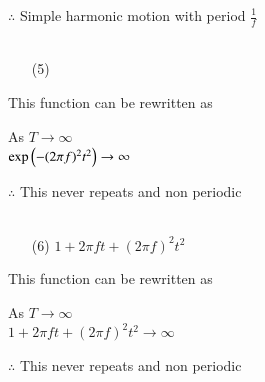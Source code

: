 \documentclass[journal,12pt,twocolumn]{IEEEtran}
\theoremstyle{remark}
\begin{document}
 $\therefore$  Simple harmonic motion with period $\frac{1}{f}$\\
 \\
 \begin{enumerate}
 \item[(5)]  \\
\end{enumerate}
This function can be rewritten as\\ 
       \begin{center}
     As $T\to\infty$\\
    $\text{exp}\left(-(2\pi f)^2 t^2\right)\to \infty$\\ 
       \end{center}
    $\therefore$  This never repeats and non periodic\\
    \\
    \begin{enumerate}
 \item[(6)] $1+2\pi f t+(2\pi f)^2t^2$\\
\end{enumerate}
This function can be rewritten as\\ 
 \begin{center}
  As $T\to\infty$\\
  $1+2\pi f t+(2\pi f)^2t^2  \to \infty$\\
  \end{center}
  $\therefore$ This never repeats and non periodic\\ 
 

 \renewcommand{\thefigure}{\theenumi}
 \renewcommand{\thetable}{\theenumi}
 
\end{document}
